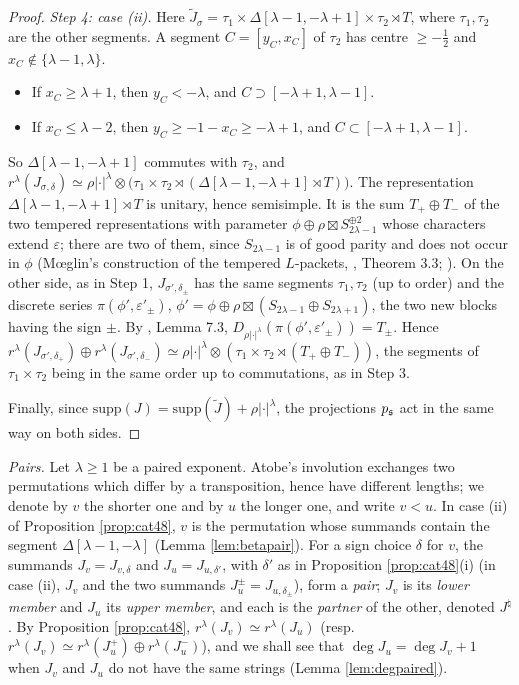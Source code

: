 \documentclass[a4paper,12pt,leqno]{amsart}
\theoremstyle{plain}
\theoremstyle{definition}
\begin{document}
\begin{proof}
\emph{Step 4: case (ii).} Here $\widetilde J_\sigma=\tau_1\times\Delta[\lambda-1,-\lambda+1]\times\tau_2\rtimes T$,
where $\tau_1,\tau_2$ are the other segments. A segment $C=[y_C,x_C]$ of $\tau_2$ has centre
$\geq-\frac12$ and $x_C\notin\{\lambda-1,\lambda\}$.
\begin{itemize}
\item If $x_C\geq\lambda+1$, then $y_C<-\lambda$, and $C\supset[-\lambda+1,\lambda-1]$.
\item If $x_C\leq\lambda-2$, then $y_C\geq-1-x_C\geq-\lambda+1$, and $C\subset[-\lambda+1,\lambda-1]$.
\end{itemize}
So $\Delta[\lambda-1,-\lambda+1]$ commutes with $\tau_2$, and $r^\lambda(J_{\sigma,\delta})\simeq
\rho|\cdot|^\lambda\otimes\big(\tau_1\times\tau_2\rtimes(\Delta[\lambda-1,-\lambda+1]\rtimes
T)\big)$. The representation $\Delta[\lambda-1,-\lambda+1]\rtimes T$ is unitary, hence semisimple. It
is the sum $T_+\oplus T_-$ of the two tempered representations with parameter
$\phi\oplus\rho\boxtimes S_{2\lambda-1}^{\oplus2}$ whose characters extend $\varepsilon$; there are two
of them, since $S_{2\lambda-1}$ is of good parity and does not occur in $\phi$ (M\oe glin's construction
of the tempered $L$-packets, \cite{Ato20}, Theorem 3.3; \cite{MT02}). On the other side, as in Step 1,
$J_{\sigma',\delta_\pm}$ has the same segments $\tau_1,\tau_2$ (up to order) and the discrete series
$\pi(\phi',\varepsilon'_\pm)$, $\phi'=\phi\oplus\rho\boxtimes(S_{2\lambda-1}\oplus S_{2\lambda+1})$, the two
new blocks having the sign $\pm$. By \cite{Xu17}, Lemma 7.3,
$D_{\rho|\cdot|^\lambda}(\pi(\phi',\varepsilon'_\pm))=T_\pm$. Hence $r^\lambda(J_{\sigma',\delta_+})\oplus
r^\lambda(J_{\sigma',\delta_-})\simeq\rho|\cdot|^\lambda\otimes(\tau_1\times\tau_2\rtimes(T_+\oplus T_-))$,
the segments of $\tau_1\times\tau_2$ being in the same order up to commutations, as in Step 3.

Finally, since $\mathrm{supp}(J)=\mathrm{supp}(\widetilde J)+\rho|\cdot|^\lambda$, the projections
$p_{\mathfrak{s}}$ act in the same way on both sides.
\end{proof}

\noindent\emph{Pairs.} Let $\lambda\geq1$ be a paired exponent. Atobe's involution exchanges two
permutations which differ by a transposition, hence have different lengths; we denote by $v$ the shorter one
and by $u$ the longer one, and write $v<u$. In case (ii) of Proposition \ref{prop:cat48}, $v$ is the
permutation whose summands contain the segment $\Delta[\lambda-1,-\lambda]$ (Lemma \ref{lem:betapair}). 
For a sign choice $\delta$ for $v$, the summands $J_v=J_{v,\delta}$ and $J_u=J_{u,\delta'}$, with $\delta'$
as in Proposition \ref{prop:cat48}(i) (in case (ii), $J_v$ and the two summands
$J_u^\pm=J_{u,\delta_\pm}$), form a \emph{pair}; $J_v$ is its \emph{lower member} and $J_u$ its \emph{upper
member}, and each is the \emph{partner} of the other, denoted $J^\natural$. By Proposition \ref{prop:cat48},
$r^\lambda(J_v)\simeq r^\lambda(J_u)$ (resp.\ $r^\lambda(J_v)\simeq r^\lambda(J_u^+)\oplus r^\lambda(J_u^-)$), and
we shall see that $\deg J_u=\deg J_v+1$ when $J_v$ and $J_u$ do not have the same strings
(Lemma \ref{lem:degpaired}).
\end{document}
